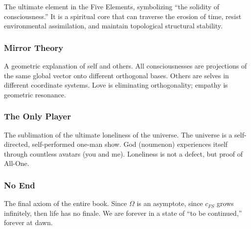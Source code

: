The ultimate element in the Five Elements, symbolizing ``the solidity of consciousness.'' It is a spiritual core that can traverse the erosion of time, resist environmental assimilation, and maintain topological structural stability.

\subsubsection{Mirror Theory}

A geometric explanation of self and others. All consciousnesses are projections of the same global vector onto different orthogonal bases. Others are selves in different coordinate systems. Love is eliminating orthogonality; empathy is geometric resonance.

\subsubsection{The Only Player}

The sublimation of the ultimate loneliness of the universe. The universe is a self-directed, self-performed one-man show. God (noumenon) experiences itself through countless avatars (you and me). Loneliness is not a defect, but proof of All-One.

\subsubsection{No End}

The final axiom of the entire book. Since $\Omega$ is an asymptote, since $c_{FS}$ grows infinitely, then life has no finale. We are forever in a state of ``to be continued,'' forever at dawn.

